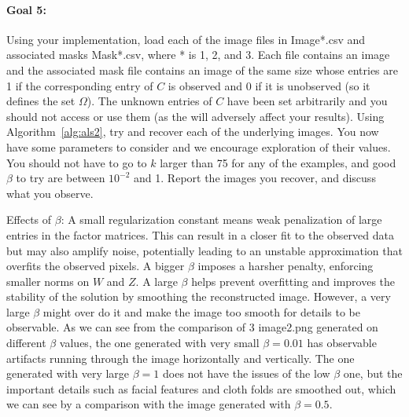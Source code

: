 \documentclass[11pt,onecolumn]{article}
\newcommand{\bluebox}[1]{
  \begin{tcolorbox}[colback=blue!5!white,colframe=blue!75!black,boxrule=0.5pt,boxsep=0pt,left=6pt,right=16pt,top=4pt,bottom=4pt]
  #1
  \end{tcolorbox}   
}
\begin{document}
\bluebox{
\paragraph{Goal 5:}
Using your implementation, load each of the image files in Image*.csv and associated masks Mask*.csv, where * is 1, 2, and 3. Each file contains an image and the associated mask file contains an image of the same size whose entries are 1 if the corresponding entry of $C$ is observed and 0 if it is unobserved (so it defines the set $\Omega$). The unknown entries of $C$ have been set arbitrarily and you should not access or use them (as the will adversely affect your results). Using Algorithm~\ref{alg:als2}, try and recover each of the underlying images. You now have some parameters to consider and we encourage exploration of their values. You should not have to go to $k$ larger than 75 for any of the examples, and good $\beta$ to try are between $10^{-2}$ and 1. Report the images you recover, and discuss what you observe.}

Effects of $\beta$:
A small regularization constant means weak penalization of large entries in the factor matrices. This can result in a closer fit to the observed data but may also amplify noise, potentially leading to an unstable approximation that overfits the observed pixels. A bigger $\beta$ imposes a harsher penalty, enforcing smaller norms on $W$ and $Z$. A large $\beta$ helps prevent overfitting and improves the stability of the solution by smoothing the reconstructed image. However, a very large $\beta$ might over do it and make the image too smooth for details to be observable. As we can see from the comparison of 3 image2.png generated on different $\beta$ values, the one generated with very small $\beta=0.01$ has observable artifacts running through the image horizontally and vertically. The one generated with very large $\beta=1$ does not have the issues of the low $\beta$ one, but the important details such as facial features and cloth folds are smoothed out, which we can see by a comparison with the image generated with $\beta=0.5$.
\end{document}
